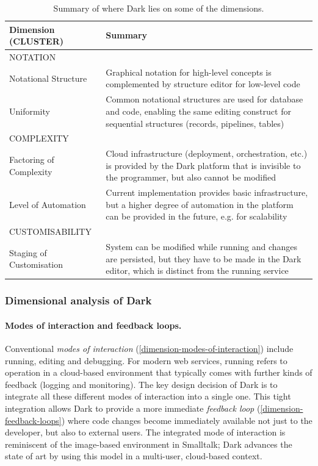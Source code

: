 \documentclass[ twoside,openright,titlepage,numbers=noenddot,headinclude,footinclude,cleardoublepage=empty,abstract=on,
                BCOR=5mm,paper=a4,fontsize=11pt
                ]{scrreprt}
\theoremstyle{definition}
\begin{document}
\begin{table}
\centering
\caption[Dark dimensions summary]{Summary of where Dark lies on some of the dimensions.}
\begin{tabular}{ >{\raggedleft\arraybackslash}p{3.6cm} p{5.6cm}}
\hline
Dimension (CLUSTER) & Summary \\ 
\hline\hline
NOTATION    \\
Notational Structure & \parbox[t]{5.6cm}{Graphical notation for high-level concepts is complemented by structure editor for low-level code} \\
Uniformity & \parbox[t]{5.6cm}{Common notational structures are used for database and code, enabling the same editing construct for sequential structures (records, pipelines, tables)}\\
\hline
COMPLEXITY  \\
Factoring of Complexity & \parbox[t]{5.6cm}{Cloud infrastructure (deployment, orchestration, etc.) is provided by the Dark platform that is invisible to the programmer, but also cannot be modified}\\
Level of Automation & \parbox[t]{5.6cm}{Current implementation provides basic infrastructure, but a higher degree of automation in the platform can be provided in the future, e.g. for scalability} \\
\hline
CUSTOMISABILITY\\   
Staging of Customisation & \parbox[t]{5.6cm}{System can be modified while running and changes are persisted, but they have to be made in the Dark editor, which is distinct from the running service}
\end{tabular}
\label{tab:dark2}
\end{table}

\hypertarget{dimensional-analysis-of-dark}{\subsubsection{Dimensional analysis of
Dark}\label{dimensional-analysis-of-dark}}

\paragraph{Modes of interaction and feedback loops.}

Conventional \emph{modes of interaction}
(\ref{dimension-modes-of-interaction}) include running, editing and
debugging. For modern web services, running refers to operation in a
cloud-based environment that typically comes with further kinds of
feedback (logging and monitoring). The key design decision of Dark is to
integrate all these different modes of interaction into a single one.
This tight integration allows Dark to provide a more immediate
\emph{feedback loop} (\ref{dimension-feedback-loops}) where code changes
become immediately available not just to the developer, but also to
external users. The integrated mode of interaction is reminiscent of the
image-based environment in Smalltalk; Dark advances the state of art by
using this model in a multi-user, cloud-based context.
\end{document}
